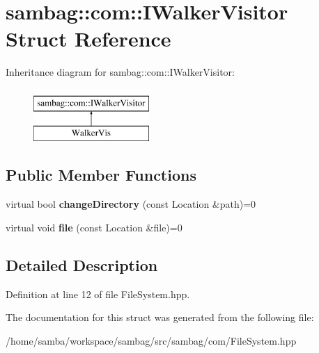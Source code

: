 \hypertarget{structsambag_1_1com_1_1_i_walker_visitor}{
\section{sambag::com::IWalkerVisitor Struct Reference}
\label{structsambag_1_1com_1_1_i_walker_visitor}
}
Inheritance diagram for sambag::com::IWalkerVisitor:\begin{figure}[H]
\begin{center}
\leavevmode
\includegraphics[height=2.000000cm]{structsambag_1_1com_1_1_i_walker_visitor}
\end{center}
\end{figure}
\subsection*{Public Member Functions}
\begin{DoxyCompactItemize}
\item 
\hypertarget{structsambag_1_1com_1_1_i_walker_visitor_a6d0c938ef555fabf03c3a29100d480f1}{
virtual bool {\bfseries changeDirectory} (const Location \&path)=0}
\label{structsambag_1_1com_1_1_i_walker_visitor_a6d0c938ef555fabf03c3a29100d480f1}

\item 
\hypertarget{structsambag_1_1com_1_1_i_walker_visitor_a5e4c733f9a546fe459f429be09358d7a}{
virtual void {\bfseries file} (const Location \&file)=0}
\label{structsambag_1_1com_1_1_i_walker_visitor_a5e4c733f9a546fe459f429be09358d7a}

\end{DoxyCompactItemize}


\subsection{Detailed Description}


Definition at line 12 of file FileSystem.hpp.



The documentation for this struct was generated from the following file:\begin{DoxyCompactItemize}
\item 
/home/samba/workspace/sambag/src/sambag/com/FileSystem.hpp\end{DoxyCompactItemize}
